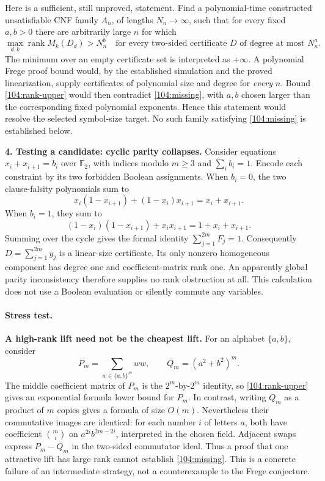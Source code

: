 \documentclass[11pt,a4paper]{article}
\numberwithin{equation}{section}
\begin{document}
Here is a sufficient, still unproved, statement. Find a polynomial-time
constructed unsatisfiable CNF family $A_n$, of lengths $N_n\to\infty$, such
that for every fixed $a,b>0$ there are arbitrarily large $n$ for which
\begin{equation}\label{104:missing}
 \max_{d,k}\operatorname{rank}M_k(D_d)>N_n^b
 \quad\text{for every two-sided certificate $D$ of degree at most $N_n^a$.}
\end{equation}
The minimum over an empty certificate set is interpreted as $+\infty$.
A polynomial Frege proof bound would, by the established simulation and the
proved linearization, supply certificates of polynomial size and degree
for \emph{every} $n$. Bound \eqref{104:rank-upper} would then contradict
\eqref{104:missing}, with $a,b$ chosen larger than the corresponding fixed
polynomial exponents. Hence this statement would resolve the selected
symbol-size target. No such family satisfying \eqref{104:missing} is
established below.

\medskip
\textbf{4. Testing a candidate: cyclic parity collapses.}
Consider equations $x_i+x_{i+1}=b_i$ over $\mathbb F_2$, with indices modulo
$m\geq3$ and $\sum_i b_i=1$. Encode each constraint by its two forbidden
Boolean assignments. When $b_i=0$, the two clause-falsity polynomials sum to
\[
 x_i(1-x_{i+1})+(1-x_i)x_{i+1}=x_i+x_{i+1}.
\]
When $b_i=1$, they sum to
\[
 (1-x_i)(1-x_{i+1})+x_ix_{i+1}=1+x_i+x_{i+1}.
\]
Summing over the cycle gives the formal identity $\sum_{j=1}^{2m}F_j=1$.
Consequently $D=\sum_{j=1}^{2m}y_j$ is a linear-size certificate. Its only
nonzero homogeneous component has degree one and coefficient-matrix rank
one. An apparently global parity inconsistency therefore supplies no rank
obstruction at all. This calculation does not use a Boolean evaluation or
silently commute any variables.

\paragraph{Stress test.}
\textbf{A high-rank lift need not be the cheapest lift.}
For an alphabet $\{a,b\}$, consider
\[
 P_m=\sum_{w\in\{a,b\}^m}ww,\qquad Q_m=(a^2+b^2)^m.
\]
The middle coefficient matrix of $P_m$ is the $2^m$-by-$2^m$ identity, so
\eqref{104:rank-upper} gives an exponential formula lower bound for $P_m$.
In contrast, writing $Q_m$ as a product of $m$ copies gives a formula of size
$O(m)$. Nevertheless their commutative images are identical: for each
number $i$ of letters $a$, both have coefficient $\binom mi$ on
$a^{2i}b^{2m-2i}$, interpreted in the chosen field. Adjacent swaps express
$P_m-Q_m$ in the two-sided commutator ideal. Thus a proof that one attractive
lift has large rank cannot establish \eqref{104:missing}. This is a concrete
failure of an intermediate strategy, not a counterexample to the Frege
conjecture.
\end{document}
